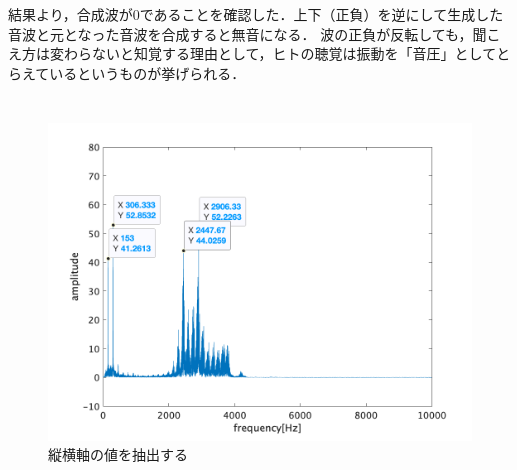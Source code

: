 \consideration
結果より，合成波が\(0\)であることを確認した．上下（正負）を逆にして生成した音波と元となった音波を合成すると無音になる．
波の正負が反転しても，聞こえ方は変わらないと知覚する理由として，ヒトの聴覚は振動を「音圧」としてとらえているというものが挙げられる．
\section{\kadaicc}\label{sec:\kadaicc}
\purpose

\begin{figure}
    \vspace{-2cm}
    \includegraphics[keepaspectratio,width=.3\textwidth]{../../Figures/03_00_ex.png}
    \caption{縦横軸の値を抽出する}
    \label{fig:縦横軸の値を抽出する}
    \vspace{-2cm}
\end{figure}

